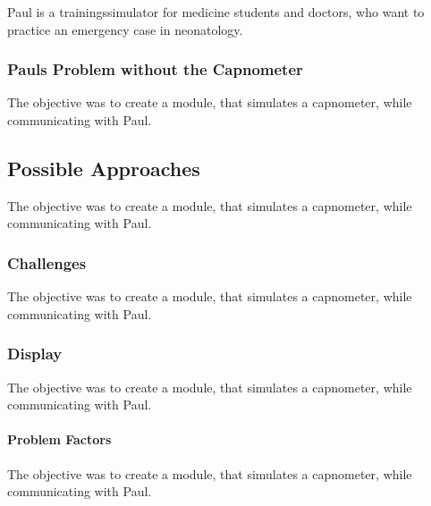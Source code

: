 \documentclass[12pt]{article}
\begin{document}
Paul is a trainingssimulator for medicine students and doctors, who want to practice
an emergency case in neonatology.


\subsubsection{Pauls Problem without the Capnometer}

The objective was to create a module, that simulates a capnometer, while communicating
with Paul.


\subsection{Possible Approaches}

The objective was to create a module, that simulates a capnometer, while communicating
with Paul.


\subsubsection{Challenges}

The objective was to create a module, that simulates a capnometer, while communicating
with Paul.


\subsubsection{Display}

The objective was to create a module, that simulates a capnometer, while communicating
with Paul.


\paragraph{Problem Factors}

The objective was to create a module, that simulates a capnometer, while communicating
with Paul.

\end{document}
